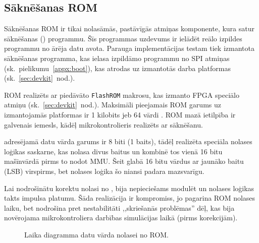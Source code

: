 \subsection{Sāknēšanas ROM} \label{sec:rom}
	Sāknēšanas ROM ir tikai nolasāmās, pastāvīgās atmiņas komponente, kura
	satur sāknēšanas () programmu.
	Šīs programmas uzdevums ir ielādēt reālo izpildes programmu no
	ārēja datu avota. Parauga implementācijas testam tiek izmantota
	sāknēšanas programma, kas ielasa izpildāmo programmu no SPI 
	atmiņas (sk.~pielikumu~\ref{appx:boot}), kas atrodas uz izmantotās
	darba platformas (sk.~\ref{sec:devkit}~nod.).
	
	ROM realizēts ar  piedāvāto
	\texttt{FlashROM} makrosu, kas izmanto  FPGA
	speciālo  atmiņu \cite{FlashROM} (sk.~\ref{sec:devkit}~nod.).
	Maksimāli pieejamais ROM garums uz izmantojamās platformas ir
	1 kilobits jeb 64 vārdi \cite[12.~lpp.]{FusionGuide}. ROM mazā ietilpība ir
	galvenais iemesls, kādēļ mikrokontrolieris realizēts ar sāknēšanu.
	
	 adresējamā datu vārda garums ir 8 biti (1 baits),
	tādēļ realizēta speciāla nolases loģikas saskarne, kas nolasa divus
	baitus un kombinē tos vienā 16 bitu mašīnvārdā pirms to nodot MMU.
	Šeit  glabā 16 bitu vārdus ar jaunāko baitu (LSB) 
	virspirms, bet nolases loģika šo niansi padara mazsvarīgu.
	
	Lai nodrošinātu korektu nolasi no , bija nepieciešams
	modulēt  un nolases loģikas takts impulsa platumu.
	Šāda realizācija ir kompromiss, jo pagarina ROM nolases laiku, bet
	nodrošina pret nestabilitāti ,,skriešanās problēmas'' dēļ, kas bija
	novērojama mikrokontroliera darbības simulācijas laikā (pirms korekcijām).
	
	\begin{figure}[tbh]
		\centering
		\def\svgwidth{\textwidth}
		{\ttfamily\small}
		\caption{Laika diagramma datu vārda nolasei no ROM.}
		\label{fig:rom-time-diag}
	\end{figure}
	
